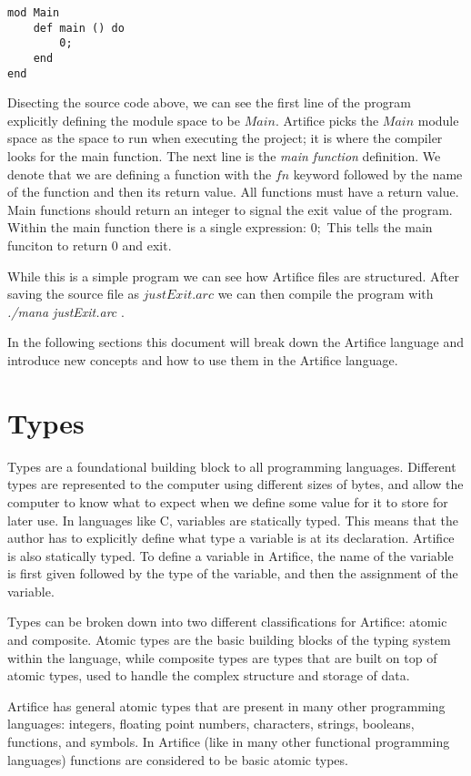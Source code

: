 \documentclass{article}
\begin{document}
\begin{lstlisting}
mod Main
	def main () do
		0;
	end
end
\end{lstlisting}

Disecting the source code above, we can see the first line of the program explicitly defining the module space to be $Main$. Artifice
picks the $Main$ module space as the space to run when executing the project; it is where the compiler looks for the main function.
The next line is the \textit{main function} definition. We denote that we are defining a function with the $fn$ keyword followed by
the name of the function and then its return value. All functions must have a return value. Main functions should return an integer
to signal the exit value of the program. Within the main function there is a single expression: $0;$ This tells the main funciton
to return $0$ and exit.

While this is a simple program we can see how Artifice files are structured. After saving the source file as $justExit.arc$ we can
then compile the program with \textit{./mana justExit.arc} .

In the following sections this document will break down the Artifice language and introduce new concepts and how to use them in the
Artifice language.


\section{Types}

Types are a foundational building block to all programming languages. Different types are represented to the computer using
different sizes of bytes, and allow the computer to know what to expect when we define some value for it to store for later
use. In languages like C, variables are statically typed. This means that the author has to explicitly define what type a
variable is at its declaration. Artifice is also statically typed. To define a variable in Artifice, the name of the variable is
first given followed by the type of the variable, and then the assignment of the variable.

Types can be broken down into two different classifications for Artifice: atomic and composite. Atomic types are the basic
building blocks of the typing system within the language, while composite types are types that are built on top of atomic
types, used to handle the complex structure and storage of data.

Artifice has general atomic types that are present in many other programming languages: integers, floating point numbers, characters,
strings, booleans, functions, and symbols. In Artifice (like in many other functional programming languages) functions are considered
to be basic atomic types.
\end{document}
